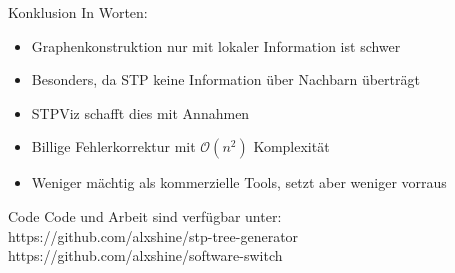 \documentclass{beamer}
\begin{document}
\begin{frame}{Konklusion}
    In Worten:
    \begin{itemize}[<+(1)->]
        \item Graphenkonstruktion nur mit lokaler Information ist schwer
        \item Besonders, da STP keine Information über Nachbarn überträgt
        \item STPViz schafft dies mit Annahmen
        \item Billige Fehlerkorrektur mit $\mathcal{O}(n^2)$ Komplexität
        \item Weniger mächtig als kommerzielle Tools, setzt aber weniger vorraus
    \end{itemize}
\end{frame}

\begin{frame}{Code}
    Code und Arbeit sind verfügbar unter:\\
    \vspace{0.5cm}
    https://github.com/alxshine/stp-tree-generator\\
    https://github.com/alxshine/software-switch
\end{frame}
\end{document}
